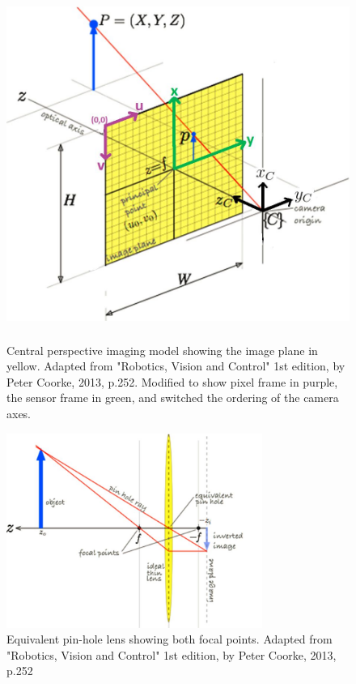 \begin{figure}
 	\centering
     \includegraphics[height=4.5in]{figures/projection_model.jpg}
     \caption[Projection model]{Central perspective imaging model showing the image plane in yellow.  Adapted from "Robotics, Vision and Control" 1st edition, by Peter Coorke, 2013, p.252. Modified to show pixel frame in purple, the sensor frame in green, and switched the ordering of the camera axes.}
     \label{projection_model}
 \end{figure}

\begin{figure}
	\centering
    \includegraphics[height=2.5in]{figures/projections_two_focal.jpg}
    \caption[Focal points]{Equivalent pin-hole lens showing both focal points. Adapted from "Robotics, Vision and Control" 1st edition, by Peter Coorke, 2013, p.252}
    \label{focal_points}
\end{figure} 


